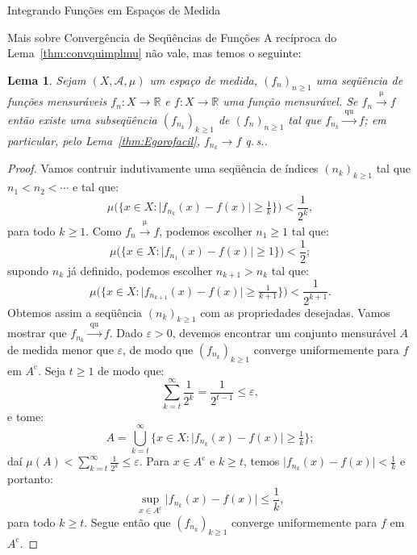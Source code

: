 \documentclass[oneside,final,11pt]{amsbook}
\newcommand{\R}{\mathds R}
\newcommand{\compl}{\mathrm c}
\newcommand{\qs}{\hbox{q.$\,$s.}}
\newcommand{\To}[1]{\xrightarrow{\;\mathrm{#1}\;}}
\theoremstyle{remark}\newtheorem{exercise}{Exercício}[chapter]
\theoremstyle{remark}\newtheorem{*exercise}[exercise]{\hbox to 0pt{\hskip 0pt minus 1fil*}Exercício}
\theoremstyle{definition}\newtheorem{exdefin}{Definição}[chapter]
\theoremstyle{plain}\newtheorem{teo}{Teorema}[section]
\theoremstyle{plain}\newtheorem{lem}[teo]{Lema}
\theoremstyle{plain}\newtheorem{prop}[teo]{Proposição}
\theoremstyle{plain}\newtheorem{cor}[teo]{Corolário}
\theoremstyle{definition}\newtheorem{defin}[teo]{Definição}
\theoremstyle{remark}\newtheorem{rem}[teo]{Observação}
\theoremstyle{definition}\newtheorem{notation}[teo]{Notação}
\theoremstyle{definition}\newtheorem{convention}[teo]{Convenção}
\theoremstyle{definition}\newtheorem{example}[teo]{Exemplo}
\numberwithin{section}{chapter}
\numberwithin{equation}{section}
\begin{document}
\begin{chapter}{Integrando Funções em Espaços de Medida}
\begin{section}{Mais sobre Convergência de Seqüências de Funções}
A recíproca do Lema~\ref{thm:convquimplmu} não vale, mas temos o seguinte:
\begin{lem}\label{thm:medsubseqqu}
Sejam $(X,\mathcal A,\mu)$ um espaço de medida, $(f_n)_{n\ge1}$ uma se\-qüên\-cia de funções mensuráveis $f_n:X\to\R$
e $f:X\to\R$ uma função mensurável. Se $f_n\To\mu f$ então existe uma subseqüência $(f_{n_k})_{k\ge1}$
de $(f_n)_{n\ge1}$ tal que $f_{n_k}\To{qu}f$; em particular, pelo Lema~\ref{thm:Egorofacil}, $f_{n_k}\to f$ \qs.
\end{lem}
\begin{proof}
Vamos contruir indutivamente uma seqüência de ín\-di\-ces $(n_k)_{k\ge1}$ tal que $n_1<n_2<\cdots$ e tal que:
\[\mu\Big(\big\{x\in X:\big\vert f_{n_k}(x)-f(x)\big\vert\ge\tfrac1k\big\}\Big)<\frac1{2^k},\]
para todo $k\ge1$. Como $f_n\To\mu f$, podemos escolher $n_1\ge1$ tal que:
\[\mu\Big(\big\{x\in X:\big\vert f_{n_1}(x)-f(x)\big\vert\ge1\big\}\Big)<\frac12;\]
supondo $n_k$ já definido, podemos escolher $n_{k+1}>n_k$ tal que:
\[\mu\Big(\big\{x\in X:\big\vert f_{n_{k+1}}(x)-f(x)\big\vert\ge\tfrac1{k+1}\big\}\Big)<\frac1{2^{k+1}}.\]
Obtemos assim a seqüência $(n_k)_{k\ge1}$ com as propriedades desejadas. Vamos mostrar que $f_{n_k}\To{qu}f$. Dado $\varepsilon>0$,
devemos encontrar um conjunto mensurável $A$ de medida menor que $\varepsilon$, de modo que $(f_{n_k})_{k\ge1}$
converge uniformemente para $f$ em $A^\compl$. Seja $t\ge1$ de modo que:
\[\sum_{k=t}^\infty\frac1{2^k}=\frac1{2^{t-1}}\le\varepsilon,\]
e tome:
\[A=\bigcup_{k=t}^\infty\big\{x\in X:\big\vert f_{n_k}(x)-f(x)\big\vert\ge\tfrac1k\big\};\]
daí $\mu(A)<\sum_{k=t}^\infty\frac1{2^k}\le\varepsilon$. Para $x\in A^\compl$ e $k\ge t$, temos
$\vert f_{n_k}(x)-f(x)\vert<\frac1k$ e portanto:
\[\sup_{x\in A^\compl}\big\vert f_{n_k}(x)-f(x)\big\vert\le\frac1k,\]
para todo $k\ge t$. Segue então que $(f_{n_k})_{k\ge1}$ converge uniformemente para $f$ em $A^\compl$.
\end{proof}


\end{section}
\end{chapter}
\end{document}
